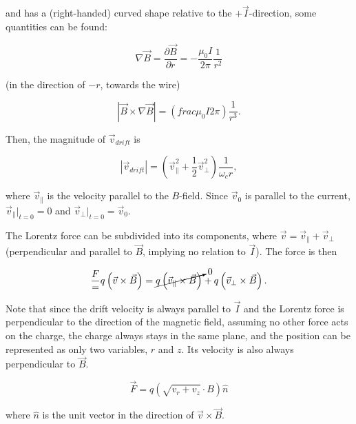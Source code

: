\documentclass{template}
\begin{document}
and has a (right-handed) curved shape relative to the $+\vec{I}$-direction, some quantities can be found:

\begin{equation}
    \nabla\vec{B} = \frac{\partial \vec{B}}{\partial r} = -\frac{\mu_0 I}{2\pi}\frac{1}{r^2}
\end{equation}

(in the direction of $-r$, towards the wire)

\begin{equation}
    |\vec{B}\times\nabla\vec{B}| = \left(frac{\mu_0 I}{2\pi}\right)\frac{1}{r^3}.
\end{equation}

Then, the magnitude of $\vec{v}_{drift}$ is

\begin{equation}
    |\vec{v}_{drift}| = \left(  \vec{v}_\parallel^2  + \frac{1}{2} \vec{v}_\perp^2 \right)\frac{1}{\omega_c r},
\end{equation}

where $\vec{v}_\parallel$ is the velocity parallel to the $B$-field. Since $\vec{v}_0$ is parallel to the current, $\vec{v}_\parallel|_{t=0} = 0$ and $\vec{v}_\perp|_{t=0} = \vec{v}_0$.

The Lorentz force can be subdivided into its components, where $\vec{v} = \vec{v}_\parallel + \vec{v}_\perp$ (perpendicular and parallel to $\vec{B}$, implying no relation to $\vec{I}$). The force is then

\begin{equation}
    \frac{F} = q\left( \vec{v} \times \vec{B} \right) = \cancelto{0}{q\left( \vec{v}_\parallel \times \vec{B} \right)} + q\left( \vec{v}_\perp \times \vec{B} \right).
\end{equation}

Note that since the drift velocity is always parallel to $\vec{I}$ and the Lorentz force is perpendicular to the direction of the magnetic field, assuming no other force acts on the charge, the charge always stays in the same plane, and the position can be represented as only two variables, $r$ and $z$. Its velocity is also always perpendicular to $\vec{B}$.

\begin{equation}
    \vec{F} = q\left( \sqrt{v_r+v_z}\cdot B \right)\hat{n}
\end{equation}

where $\hat{n}$ is the unit vector in the direction of $\vec{v}\times\vec{B}$.



% 
% 
\end{document}
